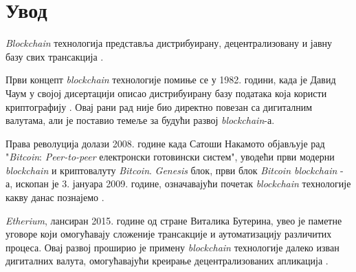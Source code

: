 \documentclass[12pt, a4paper]{article}
\begin{document}





\renewcommand{\contentsname}{Садржај} %
\tableofcontents %
\clearpage %
\setcounter{page}{4}
\pagestyle{fancy}
\fancyhf{} %
\fancyfoot[R]{\thepage} %
\renewcommand{\headrule}{} %

\section{Увод}
\textit{Blockchain} технологија представља дистрибуирану, децентрализовану и јавну базу свих трансакција \cite{1}.


Први концепт \textit{blockchain} технологије помиње се у 1982. години, када је Давид Чаум у својој дисертацији описао дистрибуирану базу података која користи криптографију \cite{2}. Овај рани рад није био директно повезан са дигиталним валутама, али је поставио темеље за будући развој \textit{blockchain}-а.

Права револуција долази 2008. године када Сатоши Накамото објављује рад "\textit{Bitcoin}: \textit{Peer-to-peer} електронски готовински систем", уводећи први модерни \textit{blockchain} и криптовалуту \textit{Bitcoin}. \textit{Genesis} блок, први блок \textit{Bitcoin blockchain} - а, ископан је 3. јануара 2009. године, означавајући почетак \textit{blockchain} технологије какву данас познајемо \cite{3}.

\textit{Etherium}, лансиран 2015. године од стране Виталика Бутерина, увео је паметне уговоре који омогућавају сложеније трансакције и аутоматизацију различитих процеса. Овај развој проширио је примену \textit{blockchain} технологије далеко изван дигиталних валута, омогућавајући креирање децентрализованих апликација \cite{4}.
\end{document}

